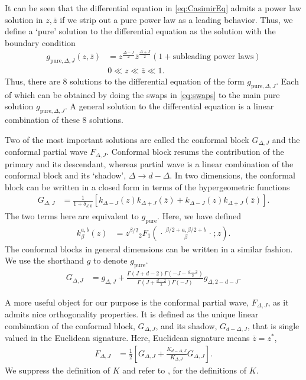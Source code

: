It can be seen that the differential equation in \cref{eq:CasimirEq} admits a power law solution in $ z , \bar{z} $ if we strip out a pure power law as a leading behavior.
Thus, we define a `pure' solution to the differential equation as the solution with the boundary condition
\begin{align}
  g_{\text{pure},\Delta,J}\left( z,\bar{z} \right) & =	z^{\frac{\Delta-J}{2}} \bar{z}^{\frac{\Delta + J}{2}} \left( 1 + \text{subleading power laws} \right)  \nonumber \\
                                                   & 0 \ll z \ll \bar{z} \ll 1
  .\end{align}
Thus, there are $ 8 $ solutions to the differential equation of the form $ g_{\text{pure},\Delta,J}$.
Each of which can be obtained by doing the swaps in \cref{eq:swaps} to the main pure solution $ g_{\text{pure},\Delta,J} $.
A general solution to the differential equation is a linear combination of these $ 8 $ solutions.

Two of the most important solutions are called the conformal block $ G_{\Delta,J} $ and the conformal partial wave $ F_{\Delta,J} $.
Conformal block resums the contribution of the primary and its descendant, whereas partial wave is a linear combination of the conformal block and its `shadow', $ \Delta \rightarrow d-\Delta $.
In two dimensions, the conformal block can be written in a closed form in terms of the hypergeometric functions
\begin{align}
  G_{\Delta,J } & = \frac{1}{1+\delta_{J,0}} \left[ k_{\Delta-J}\left( z \right) k_{\Delta+J}\left( \bar{z} \right) + k_{\Delta-J}\left( z \right)  k_{\Delta+J}\left( \bar{z} \right)  \right]
  .\end{align}
The two terms here are equivalent to $ g_{\text{pure}} $.
Here, we have defined
\begin{align}
  k_{\beta}^{a,b}\left( z \right) & = z^{\beta/2}
  {{}_{2}F_{1}\left(\genfrac..{0pt}{}{\beta/2+ a , \beta/2 +b}{\beta};z\right)}
  .\end{align}
The conformal blocks in general dimensions can be written in a similar fashion.
We use the shorthand $ g $ to denote $ g_{\text{pure}} $.
\begin{align}
  G_{\Delta,J} & = g_{\Delta,J} + \frac{\Gamma\left( J+d-2 \right)  \Gamma\left( -J - \frac{d-2}{2} \right)	}{ \Gamma\left( J+ \frac{d-2}{2} \right) \Gamma\left( -J \right)}  g_{\Delta, 2-d-J}
  .\end{align}

A more useful object for our purpose is the conformal partial wave, $ F_{\Delta,J} $, as it admits nice orthogonality properties.
It is defined as the unique linear combination of the conformal block, $ G_{\Delta, J} $, and its shadow, $ G_{d-\Delta, J} $, that is single valued in the Euclidean signature.
Here, Euclidean signature means $ \bar{z} = z^{*} $,
\begin{align}
  \label{eq:partialWaveIntro}
  F_{\Delta,J} & =\frac{1}{2}\left[  G_{\Delta,J} + \frac{K_{d-\Delta,J} }{K_{\Delta,J} }G_{\Delta,J} \right]
  .\end{align}
We suppress the definition of $ K $ and refer to \cite{Caron-Huot:2017vep}, for the definitions of $ K $.

